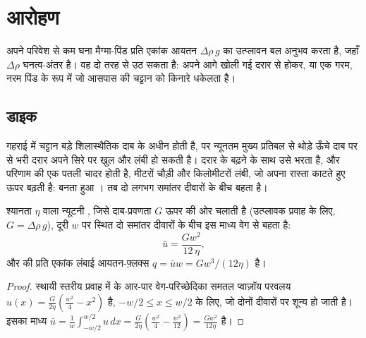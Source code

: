 \section{आरोहण}

अपने परिवेश से कम घना मैग्मा-पिंड प्रति एकांक आयतन
$\Delta\rho\,g$ का उत्प्लावन बल अनुभव करता है, जहाँ $\Delta\rho$ घनत्व-अंतर है। वह
दो तरह से उठ सकता है: अपने आगे खोली गई दरार से होकर, या एक गरम,
नरम पिंड के रूप में जो आसपास की चट्टान को किनारे धकेलता है।

\subsection{डाइक}

गहराई में चट्टान बड़े शिलास्थैतिक दाब के अधीन होती है, पर न्यूनतम मुख्य प्रतिबल से
थोड़े ऊँचे दाब पर  से भरी दरार अपने सिरे पर खुल
और लंबी हो सकती है। दरार के बढ़ने के साथ  उसे भरता है, और परिणाम
 की एक पतली चादर होती है, मीटरों चौड़ी और किलोमीटरों लंबी, जो अपना रास्ता काटते हुए
ऊपर बढ़ती है: बनता हुआ । तब  दो लगभग समांतर
दीवारों के बीच बहता है।

\begin{proposition}[डाइक में मैग्मा का प्रवाह]\label{prop:b2:magma-emplacement:poiseuille}
श्यानता $\eta$ वाला न्यूटनी , जिसे दाब-प्रवणता $G$ ऊपर की ओर चलाती है
(उत्प्लावक प्रवाह के लिए, $G = \Delta\rho\,g$), दूरी $w$ पर स्थित दो समांतर दीवारों के बीच
इस माध्य वेग से बहता है:
\[
\bar u = \frac{G w^2}{12\,\eta},
\]
और  की प्रति एकांक लंबाई आयतन-फ़्लक्स $q = \bar u w = G w^3/(12\eta)$ है।
\end{proposition}

\begin{proof}
स्थायी स्तरीय प्रवाह में  के आर-पार वेग-परिच्छेदिका समतल
प्वाज़ॉय परवलय $u(x) = \frac{G}{2\eta}\left(\frac{w^2}{4} - x^2\right)$ है,
$-w/2 \le x \le w/2$ के लिए, जो दोनों दीवारों पर शून्य हो जाती है। इसका माध्य
$\bar u = \frac1w\int_{-w/2}^{w/2}u\,dx = \frac{G}{2\eta}\left(\frac{w^2}{4} -
\frac{w^2}{12}\right) = \frac{Gw^2}{12\eta}$ है।
\end{proof}

